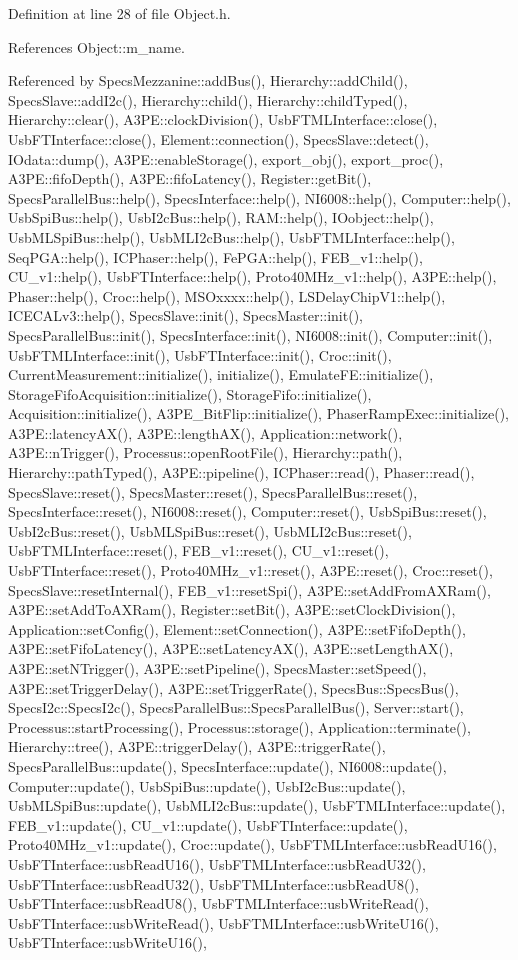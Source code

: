 Definition at line 28 of file Object.h.

References Object::m\_\-name.

Referenced by SpecsMezzanine::addBus(), Hierarchy::addChild(), SpecsSlave::addI2c(), Hierarchy::child(), Hierarchy::childTyped(), Hierarchy::clear(), A3PE::clockDivision(), UsbFTMLInterface::close(), UsbFTInterface::close(), Element::connection(), SpecsSlave::detect(), IOdata::dump(), A3PE::enableStorage(), export\_\-obj(), export\_\-proc(), A3PE::fifoDepth(), A3PE::fifoLatency(), Register::getBit(), SpecsParallelBus::help(), SpecsInterface::help(), NI6008::help(), Computer::help(), UsbSpiBus::help(), UsbI2cBus::help(), RAM::help(), IOobject::help(), UsbMLSpiBus::help(), UsbMLI2cBus::help(), UsbFTMLInterface::help(), SeqPGA::help(), ICPhaser::help(), FePGA::help(), FEB\_\-v1::help(), CU\_\-v1::help(), UsbFTInterface::help(), Proto40MHz\_\-v1::help(), A3PE::help(), Phaser::help(), Croc::help(), MSOxxxx::help(), LSDelayChipV1::help(), ICECALv3::help(), SpecsSlave::init(), SpecsMaster::init(), SpecsParallelBus::init(), SpecsInterface::init(), NI6008::init(), Computer::init(), UsbFTMLInterface::init(), UsbFTInterface::init(), Croc::init(), CurrentMeasurement::initialize(), initialize(), EmulateFE::initialize(), StorageFifoAcquisition::initialize(), StorageFifo::initialize(), Acquisition::initialize(), A3PE\_\-BitFlip::initialize(), PhaserRampExec::initialize(), A3PE::latencyAX(), A3PE::lengthAX(), Application::network(), A3PE::nTrigger(), Processus::openRootFile(), Hierarchy::path(), Hierarchy::pathTyped(), A3PE::pipeline(), ICPhaser::read(), Phaser::read(), SpecsSlave::reset(), SpecsMaster::reset(), SpecsParallelBus::reset(), SpecsInterface::reset(), NI6008::reset(), Computer::reset(), UsbSpiBus::reset(), UsbI2cBus::reset(), UsbMLSpiBus::reset(), UsbMLI2cBus::reset(), UsbFTMLInterface::reset(), FEB\_\-v1::reset(), CU\_\-v1::reset(), UsbFTInterface::reset(), Proto40MHz\_\-v1::reset(), A3PE::reset(), Croc::reset(), SpecsSlave::resetInternal(), FEB\_\-v1::resetSpi(), A3PE::setAddFromAXRam(), A3PE::setAddToAXRam(), Register::setBit(), A3PE::setClockDivision(), Application::setConfig(), Element::setConnection(), A3PE::setFifoDepth(), A3PE::setFifoLatency(), A3PE::setLatencyAX(), A3PE::setLengthAX(), A3PE::setNTrigger(), A3PE::setPipeline(), SpecsMaster::setSpeed(), A3PE::setTriggerDelay(), A3PE::setTriggerRate(), SpecsBus::SpecsBus(), SpecsI2c::SpecsI2c(), SpecsParallelBus::SpecsParallelBus(), Server::start(), Processus::startProcessing(), Processus::storage(), Application::terminate(), Hierarchy::tree(), A3PE::triggerDelay(), A3PE::triggerRate(), SpecsParallelBus::update(), SpecsInterface::update(), NI6008::update(), Computer::update(), UsbSpiBus::update(), UsbI2cBus::update(), UsbMLSpiBus::update(), UsbMLI2cBus::update(), UsbFTMLInterface::update(), FEB\_\-v1::update(), CU\_\-v1::update(), UsbFTInterface::update(), Proto40MHz\_\-v1::update(), Croc::update(), UsbFTMLInterface::usbReadU16(), UsbFTInterface::usbReadU16(), UsbFTMLInterface::usbReadU32(), UsbFTInterface::usbReadU32(), UsbFTMLInterface::usbReadU8(), UsbFTInterface::usbReadU8(), UsbFTMLInterface::usbWriteRead(), UsbFTInterface::usbWriteRead(), UsbFTMLInterface::usbWriteU16(), UsbFTInterface::usbWriteU16(), 